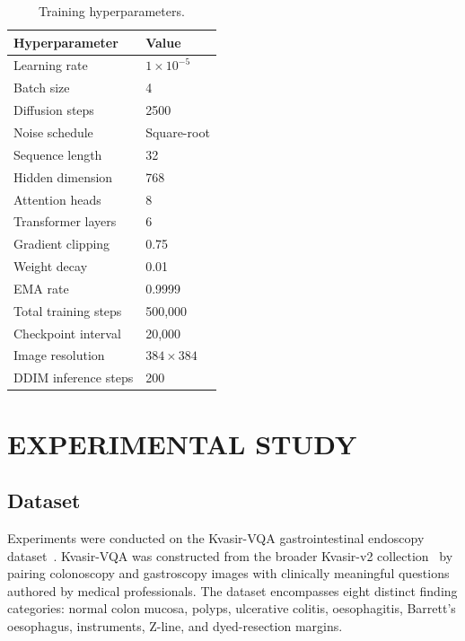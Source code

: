 \documentclass[9pt]{report}
\begin{document}
\begin{table}[h]
\centering
\caption{Training hyperparameters.}
\label{tab:hyperparams}
\begin{tabular}{ll}
\hline
\textbf{Hyperparameter} & \textbf{Value} \\ \hline
Learning rate           & $1 \times 10^{-5}$ \\
Batch size              & 4 \\
Diffusion steps         & 2500 \\
Noise schedule          & Square-root \\
Sequence length         & 32 \\
Hidden dimension        & 768 \\
Attention heads         & 8 \\
Transformer layers      & 6 \\
Gradient clipping       & 0.75 \\
Weight decay            & 0.01 \\
EMA rate                & 0.9999 \\
Total training steps    & 500,000 \\
Checkpoint interval     & 20,000 \\
Image resolution        & $384 \times 384$ \\
DDIM inference steps    & 200 \\ \hline
\end{tabular}
\end{table}

\chapter{EXPERIMENTAL STUDY}
\label{chap:experiments}

\section{Dataset}

Experiments were conducted on the Kvasir-VQA gastrointestinal endoscopy dataset~\cite{kvasir}. Kvasir-VQA was constructed from the broader Kvasir-v2 collection~\cite{kvasir} by pairing colonoscopy and gastroscopy images with clinically meaningful questions authored by medical professionals. The dataset encompasses eight distinct finding categories: normal colon mucosa, polyps, ulcerative colitis, oesophagitis, Barrett's oesophagus, instruments, Z-line, and dyed-resection margins.
\end{document}
